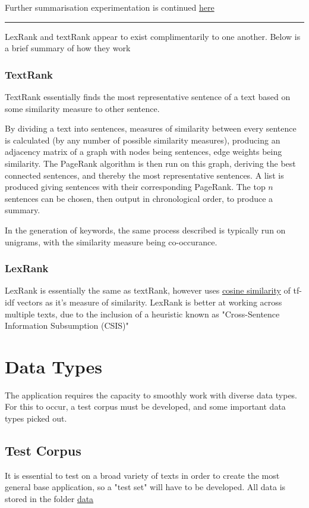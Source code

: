 \documentclass[11pt]{article}
\begin{document}
Further summarisation experimentation is continued
\href{summarisation\_experimentation.Rmd}{here}

\noindent\rule{\textwidth}{0.5pt}

LexRank and textRank appear to exist complimentarily to one another.
Below is a brief summary of how they work

\subsubsection{TextRank}
\label{sec:orgc2b638a}

TextRank essentially finds the most representative sentence of a text
based on some similarity measure to other sentence.

By dividing a text into sentences, measures of similarity between every
sentence is calculated (by any number of possible similarity measures),
producing an adjacency matrix of a graph with nodes being sentences,
edge weights being similarity. The PageRank algorithm is then run on
this graph, deriving the best connected sentences, and thereby the most
representative sentences. A list is produced giving sentences with their
corresponding PageRank. The top \(n\) sentences can be chosen, then output
in chronological order, to produce a summary.

In the generation of keywords, the same process described is typically
run on unigrams, with the similarity measure being co-occurance.

\subsubsection{LexRank}
\label{sec:org2e1c9ea}
LexRank is essentially the same as textRank, however uses
\href{https://en.wikipedia.org/wiki/Cosine\_similarity}{cosine similarity} of tf-idf vectors as it's measure of similarity. LexRank is better at
working across multiple texts, due to the inclusion of a heuristic known
as "Cross-Sentence Information Subsumption (CSIS)"
\section{Data Types}
\label{sec:orgd8f78a2}

The application requires the capacity to smoothly work with diverse data types. For this to occur, a test corpus must be developed, and some important data types picked out.

\subsection{Test Corpus}
\label{sec:org430bccb}
It is essential to test on a broad variety of texts in order to create
the most general base application, so a "test set" will have to be
developed. All data is stored in the folder \href{data}{data}
\end{document}
